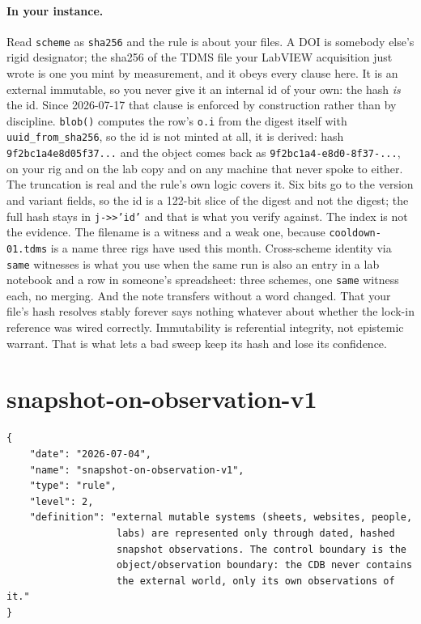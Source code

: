 \paragraph{In your instance.} Read \texttt{scheme} as \texttt{sha256} and the rule is about your files. A DOI is somebody else's rigid designator; the sha256 of the TDMS file your LabVIEW acquisition just wrote is one you mint by measurement, and it obeys every clause here. It is an external immutable, so you never give it an internal id of your own: the hash \emph{is} the id. Since 2026-07-17 that clause is enforced by construction rather than by discipline. \texttt{blob()} computes the row's \texttt{o.i} from the digest itself with \texttt{uuid\_from\_sha256}, so the id is not minted at all, it is derived: hash \texttt{9f2bc1a4e8d05f37...} and the object comes back as \texttt{9f2bc1a4-e8d0-8f37-...}, on your rig and on the lab copy and on any machine that never spoke to either. The truncation is real and the rule's own logic covers it. Six bits go to the version and variant fields, so the id is a 122-bit slice of the digest and not the digest; the full hash stays in \texttt{j->>'id'} and that is what you verify against. The index is not the evidence. The filename is a witness and a weak one, because \texttt{cooldown-01.tdms} is a name three rigs have used this month. Cross-scheme identity via \texttt{same} witnesses is what you use when the same run is also an entry in a lab notebook and a row in someone's spreadsheet: three schemes, one \texttt{same} witness each, no merging. And the note transfers without a word changed. That your file's hash resolves stably forever says nothing whatever about whether the lock-in reference was wired correctly. Immutability is referential integrity, not epistemic warrant. That is what lets a bad sweep keep its hash and lose its confidence.

\section{snapshot-on-observation-v1}

\begin{lstlisting}[language={},basicstyle=\ttfamily\footnotesize]
{
    "date": "2026-07-04",
    "name": "snapshot-on-observation-v1",
    "type": "rule",
    "level": 2,
    "definition": "external mutable systems (sheets, websites, people,
                   labs) are represented only through dated, hashed
                   snapshot observations. The control boundary is the
                   object/observation boundary: the CDB never contains
                   the external world, only its own observations of it."
}
\end{lstlisting}

